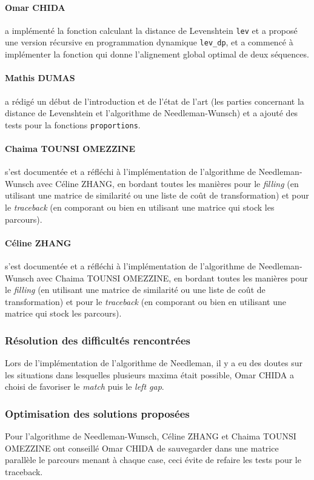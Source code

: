 \paragraph*{Omar CHIDA} a implémenté la fonction calculant la distance de Levenshtein \texttt{lev} et a proposé une version récursive en programmation dynamique \texttt{lev\_dp}, et a commencé à implémenter la fonction qui donne l'alignement global optimal de deux séquences.

\paragraph*{Mathis DUMAS} a rédigé un début de l'introduction et de l'état de l'art (les parties concernant la distance de Levenshtein et l'algorithme de Needleman-Wunsch) et a ajouté des tests pour la fonctions \texttt{proportions}.

\paragraph*{Chaima TOUNSI OMEZZINE} s'est documentée et a réfléchi à l'implémentation de l'algorithme de Needleman-Wunsch avec Céline ZHANG, en bordant toutes les manières pour le \textsl{filling} (en utilisant une matrice de similarité ou une liste de coût de transformation) et pour le \textsl{traceback} (en comporant ou bien en utilisant une matrice qui stock les parcours).

\paragraph*{Céline ZHANG} s'est documentée et a réfléchi à l'implémentation de l'algorithme de Needleman-Wunsch avec Chaima TOUNSI OMEZZINE, en bordant toutes les manières pour le \textsl{filling} (en utilisant une matrice de similarité ou une liste de coût de transformation) et pour le \textsl{traceback} (en comporant ou bien en utilisant une matrice qui stock les parcours).

\subsubsection*{Résolution des difficultés rencontrées}
Lors de l'implémentation de l'algorithme de Needleman, il y a eu des doutes sur les situations dans lesquelles plusieurs maxima était possible, Omar CHIDA a choisi de favoriser le \textsl{match} puis le \textsl{left gap}.

\subsubsection*{Optimisation des solutions proposées}
Pour l'algorithme de Needleman-Wunsch, Céline ZHANG et Chaima TOUNSI OMEZZINE ont conseillé Omar CHIDA de sauvegarder dans une matrice parallèle le parcours menant à chaque case, ceci évite de refaire les tests pour le traceback.


